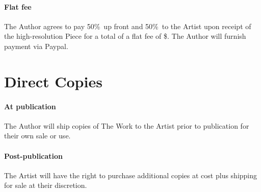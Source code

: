 \documentclass[12pt,letterpaper]{article}
\def\UpFront{50\%}
\def\AtCompletion{50\%}
\def\FlatFee{\$\TextField[width=1.5cm]}
\def\PrintRoyalties{25\%}
\def\DigitalRoyalties{50\%}
\def\PaymentMechanism{Paypal} %
\begin{document}
\paragraph{Flat fee}

The Author agrees to pay \UpFront\ up front and \AtCompletion\ to the Artist upon receipt of the high-resolution Piece for a total of a flat fee of \FlatFee. The Author will furnish payment via \PaymentMechanism.

%
%
%
%
%
%
%

\section{Direct Copies}

\paragraph{At publication} The Author will ship copies of The Work to the Artist prior to publication for their own sale or use.

\paragraph{Post-publication} The Artist will have the right to purchase additional copies at cost plus shipping for sale at their discretion.
\end{document}
